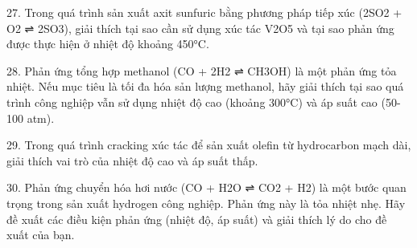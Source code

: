 27. Trong quá trình sản xuất axit sunfuric bằng phương pháp tiếp xúc (2SO2 + O2 ⇌ 2SO3), giải thích tại sao cần sử dụng xúc tác V2O5 và tại sao phản ứng được thực hiện ở nhiệt độ khoảng 450°C.

28. Phản ứng tổng hợp methanol (CO + 2H2 ⇌ CH3OH) là một phản ứng tỏa nhiệt. Nếu mục tiêu là tối đa hóa sản lượng methanol, hãy giải thích tại sao quá trình công nghiệp vẫn sử dụng nhiệt độ cao (khoảng 300°C) và áp suất cao (50-100 atm).

29. Trong quá trình cracking xúc tác để sản xuất olefin từ hydrocarbon mạch dài, giải thích vai trò của nhiệt độ cao và áp suất thấp.

30. Phản ứng chuyển hóa hơi nước (CO + H2O ⇌ CO2 + H2) là một bước quan trọng trong sản xuất hydrogen công nghiệp. Phản ứng này là tỏa nhiệt nhẹ. Hãy đề xuất các điều kiện phản ứng (nhiệt độ, áp suất) và giải thích lý do cho đề xuất của bạn.














